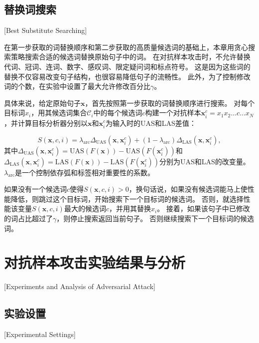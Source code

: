 \subsection{替换词搜索}[Best Substitute Searching]

在第一步获取的词替换顺序和第二步获取的高质量候选词的基础上，本章用贪心搜索策略搜索合适的候选词替换原始句子中的词。
在对抗样本攻击时，不允许替换代词、冠词、连词、数字、感叹词、限定疑问词和标点符号。
这是因为这些词的替换不仅容易改变句子结构，也很容易降低句子的流畅性。
此外，为了控制修改词的个数，在实验中设置了最大允许修改百分比$\gamma$。 %

具体来说，给定原始句子$\bm{x}$，首先按照第一步获取的词替换顺序进行搜索。
对每个目标词$x_i$，用其候选词集合$\mathcal{C}_i$中的每个候选词$c$构建一个对抗样本$\bm{x}^c_{i} = x_1x_2\dots c\dots x_N$，并计算目标分析器分别以$\bm{x}$和$\bm{x}^c_{i}$为输入时的UAS和LAS差值：

\begin{equation}
	\label{eq:mis-inc}
	S(\bm{x},c,i) =  \lambda_{\text{arc}}\Delta_\text{UAS}(\bm{x},\bm{x}^c_{i}) +
	 (1-\lambda_{\text{arc}})\Delta_\text{LAS}(\bm{x},\bm{x}^c_{i}),
\end{equation}
其中$\Delta_\text{UAS}(\bm{x},\bm{x}^c_{i}) = \text{UAS}(F(\bm{x})) - \text{UAS}(F(\bm{x}^c_{i})) $和$\Delta_\text{LAS}(\bm{x},\bm{x}^c_{i}) = \text{LAS}(F(\bm{x})) - \text{LAS}(F(\bm{x}^c_{i}))$分别为UAS和LAS的改变量。 
$\lambda_{\text{arc}}$是一个控制依存弧和标签相对重要性的系数。%

如果没有一个候选词$c$使得$S(\bm{x},c,i) > 0$，换句话说，如果没有候选词能马上使性能降低，则跳过这个目标词，开始搜索下一个目标词的候选词。
否则，就选择性能该变量$S(\bm{x},c,i)$最大的候选词$c$，并用其替换$x_i$。
接着，如果该句子中已修改的词占比超过了$\gamma$，则停止搜索返回当前句子。
否则继续搜索下一个目标词的候选词。


\section{对抗样本攻击实验结果与分析}[Experiments and Analysis of Adversarial Attack]

\subsection{实验设置}[Experimental Settings]

